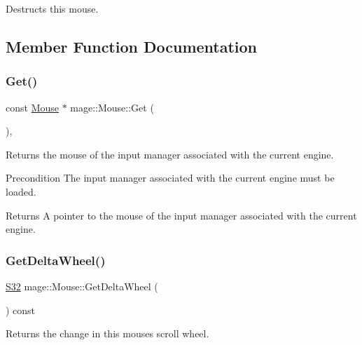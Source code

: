 Destructs this mouse. 

\subsection{Member Function Documentation}
\hypertarget{classmage_1_1_mouse_aa62bca1d085e86eeff1bf07e232e2a24}{}\label{classmage_1_1_mouse_aa62bca1d085e86eeff1bf07e232e2a24} 
\subsubsection{\texorpdfstring{Get()}{Get()}}
{\footnotesize\ttfamily const \hyperlink{classmage_1_1_mouse}{Mouse} $\ast$ mage\+::\+Mouse\+::\+Get (\begin{DoxyParamCaption}{ }\end{DoxyParamCaption})\hspace{0.3cm}{\ttfamily [static]}, {\ttfamily [noexcept]}}

Returns the mouse of the input manager associated with the current engine.

\begin{DoxyPrecond}{Precondition}
The input manager associated with the current engine must be loaded. 
\end{DoxyPrecond}
\begin{DoxyReturn}{Returns}
A pointer to the mouse of the input manager associated with the current engine. 
\end{DoxyReturn}
\hypertarget{classmage_1_1_mouse_ad683097cc0cec09eb5c2ad1b17bd729f}{}\label{classmage_1_1_mouse_ad683097cc0cec09eb5c2ad1b17bd729f} 
\subsubsection{\texorpdfstring{Get\+Delta\+Wheel()}{GetDeltaWheel()}}
{\footnotesize\ttfamily \hyperlink{namespacemage_a642e05c5c83642b6946703615cdbf2da}{S32} mage\+::\+Mouse\+::\+Get\+Delta\+Wheel (\begin{DoxyParamCaption}{ }\end{DoxyParamCaption}) const\hspace{0.3cm}{\ttfamily [noexcept]}}

Returns the change in this mouse\textquotesingle{}s scroll wheel.

